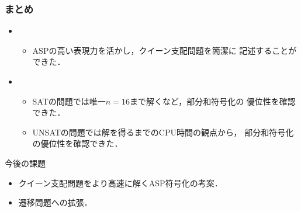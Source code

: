 \documentclass[dvipdfmx,10pt]{beamer}
\begin{document}
%
%

\begin{frame}\frametitle{まとめ}
  \begin{itemize}
   \item {}
	 \begin{itemize}
	  \item ASPの高い表現力を活かし，クイーン支配問題を簡潔に
		記述することができた．
	 \end{itemize}
   \item {}
	 \begin{itemize}
	  \item SATの問題では唯一$n=16$まで解くなど，部分和符号化の
		優位性を確認できた．
	  \item UNSATの問題では解を得るまでのCPU時間の観点から，
		部分和符号化の優位性を確認できた．
	 \end{itemize}
  \end{itemize}
 \begin{alertblock}{今後の課題}
  \begin{itemize}
   \item クイーン支配問題をより高速に解くASP符号化の考案．
   \item 遷移問題への拡張．
  \end{itemize}
 \end{alertblock}
\end{frame}

%
%


\end{document}
